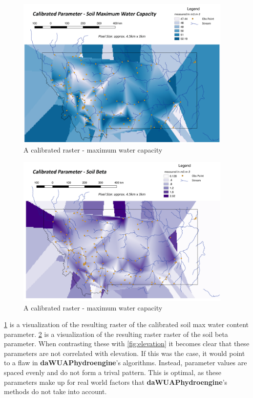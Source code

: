 \begin{figure}[h]
    \centering
    \includegraphics[width=0.95\textwidth]{max_wat}
    \caption{A calibrated raster - maximum water capacity}
    \label{fig:max_wat}
\end{figure} 

\begin{figure}[h]
    \centering
    \includegraphics[width=0.95\textwidth]{soil_beta}
    \caption{A calibrated raster - maximum water capacity}
    \label{fig:soil_beta}
\end{figure} 

\ref{fig:max_wat} is a visualization of the resulting raster of the calibrated soil max water content parameter. \ref{fig:soil_beta} is a visualization of the resulting raster raster of the soil beta parameter. When contrasting these with \ref{fig:elevation} it becomes clear that these parameters are not correlated with elevation. If this was the case, it would point to a flaw in \textbf{daWUAPhydroengine}'s algorithms. Instead, parameter values are spaced evenly and do not form a trival pattern. This is optimal, as these parameters make up for real world factors that \textbf{daWUAPhydroengine}'s methods do not take into account.

